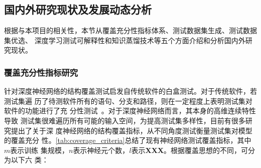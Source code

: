 \subsection{国内外研究现状及发展动态分析}\label{relatedwork}


根据与本项目的相关性，本节从覆盖充分性指标体系、测试数据集生成、测试数据集优选、
深度学习测试可解释性和知识蒸馏技术等五个方面介绍和分析国内外研究现状。




\subsubsection{覆盖充分性指标研究}
针对深度神经网络的结构覆盖测试启发自传统软件的白盒测试。对于传统软件，若测试集遍
历了待测软件所有的语句、分支和路径，则在一定程度上表明测试集对软件的功能进行了充
分性测试~\cite{hilton2018large}。对于深度神经网络而言，其本身的高维连续特性导致
测试集很难遍历所有可能的输入空间，为提高测试集多样性，目前有很多研究提出了关于深
度神经网络的结构覆盖指标，从不同角度测试衡量测试集对模型的覆盖充分
性。\cref{tab:coverage_criteria}总结了现有神经网络测试覆盖指标，其中$m$表示训练
集规模，$n$表示神经元个数，$l$表示\textbf{XXX}。根据覆盖思想的不同，可分为以下六
类：


